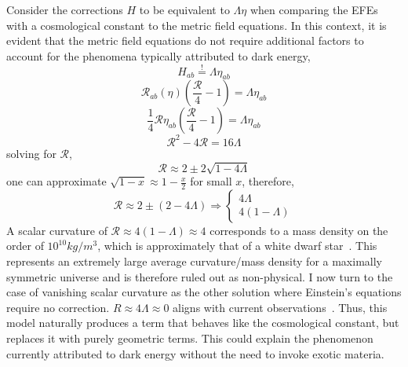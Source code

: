 \documentclass[aps,prd,preprint]{revtex4-1}
\begin{document}
Consider the corrections $H$ to be equivalent to $\Lambda\eta$ when comparing the EFEs with a cosmological constant to the metric field equations. In this context, it is evident that the metric field equations do not require additional factors to account for the phenomena typically attributed to dark energy,
\begin{equation*}
    H_{ab} \overset{!}= \Lambda\eta_{ab}
\end{equation*}
\begin{equation*}
    \mathcal{R}_{ab}(\eta) \left( \frac{\mathcal{R}}{4} - 1 \right) = \Lambda\eta_{ab}
\end{equation*}
\begin{equation*}
    \frac{1}{4}\mathcal{R}\eta_{ab} \left( \frac{\mathcal{R}}{4} - 1 \right) = \Lambda\eta_{ab}
\end{equation*}
\begin{equation}
    \mathcal{R}^2 - 4\mathcal{R} = 16\Lambda
\end{equation}
solving for $\mathcal{R}$,
\begin{equation}
    \mathcal{R} \approx 2 \pm 2\sqrt{1-4\Lambda}
\end{equation}
one can approximate $\sqrt{1-x} \approx 1 - \frac{x}{2}$ for small $x$, therefore,
\begin{equation}
    \mathcal{R} \approx 2 \pm (2 - 4\Lambda) \Rightarrow \begin{cases} 4\Lambda \\ 4 (1 - \Lambda) \end{cases}
\end{equation}
A scalar curvature of $\mathcal{R} \approx 4 (1 - \Lambda) \approx 4$ corresponds to a mass density on the order of $10^{10} kg/m^3$, which is approximately that of a white dwarf star~\cite{panei_1999}. This represents an extremely large average curvature/mass density for a maximally symmetric universe and is therefore ruled out as non-physical. I now turn to the case of vanishing scalar curvature as the other solution where Einstein's equations require no correction. $R \approx 4\Lambda \approx 0$ aligns with current observations~\cite{barrow_2011}. Thus, this model naturally produces a term that behaves like the cosmological constant, but replaces it with purely geometric terms. This could explain the phenomenon currently attributed to dark energy without the need to invoke exotic materia.
\end{document}
